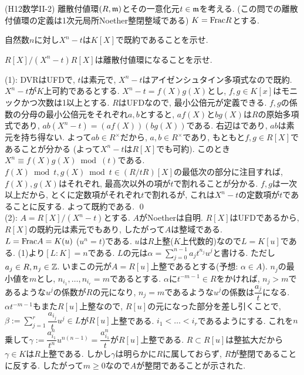 \begin{egprob} (H12数学II-2) \label{prob:H12-II-2}
離散付値環$(R,\mathfrak{m})$とその一意化元$t\in \mathfrak{m}$を考える. (この問での離散付値環の定義は1次元局所Noether整閉整域である) $K=\mathrm{Frac}R$とする.
\ben
\item 自然数$n$に対し$X^n-t$は$K[X]$で既約であることを示せ.
\item $R[X]/(X^n-t)R[X]$は離散付値環になることを示せ.
\een
\end{egprob}
\begin{egans}
(1): DVRはUFDで, $t$は素元で, $X^n - t$はアイゼンシュタイン多項式なので既約. \\
 $X^n - t$が$K$上可約であるとする. $X^n - t = f(X)g(X)$とし, $f,g\in K[x]$はモニックかつ次数は1以上とする. $R$はUFDなので, 最小公倍元が定義できる. $f,g$の係数の分母の最小公倍元をそれぞれ$a,b$とすると, $af(X)$と$bg(X)
$は$R$の原始多項式であり, $ab(X^n - t) = (af(X))(bg(X))$である. 右辺はであり, $ab$は素元を持ち得ない. よって$ab\in R^{\times}$だから, $a,b\in R^{\times}$であり, もともと$f,g\in R[X]$であることが分かる (よって$X^n-t$は$R[X]$でも可約). このとき$X^n \equiv f(X)g(X) \bmod{(t)}$である. $f(X) \bmod{t},g(X)\bmod{t} \in (R/tR)[X]$の最低次の部分に注目すれば, $f(X),g(X)$はそれぞれ, 最高次以外の項が$t$で割れることが分かる. $f,g$は一次以上だから, とくに定数項がそれぞれ$t$で割れるが, これは$X^n-t$の定数項が$t$であることに反する. よって既約である. \qed \\
(2): $A=R[X]/(X^n-t)$とする. $A$がNoetherは自明. $R[X]$はUFDであるから, $R[X]$の既約元は素元でもあり, したがって$A$は整域である. \\
 $L=\mathrm{Frac}A = K(u)$ ($u^n = t$)である. $u$は$R$上整($K$上代数的)なので$L=K[u]$である. (1)より$[L:K] = n$である. $L$の元は$\alpha = \sum_{j=0}^{n-1} a_jt^{n_j} u^j$と書ける. ただし$a_j\in R, n_j\in \mathbb{Z}$.  いまこの元が$A=R[u]$上整であるとする(予想: $\alpha \in A$). $n_j$の最小値を$m$とし, $n_{i_1},\dots, n_{i_r} = m$であるとする. 
$\alpha$に$t^{-m-1}\in R$をかければ, $n_j > m$であるような$u^j$の係数が$R$の元になり, $n_j = m$であるような$u^j$の係数は$\dfrac{a_j}{t}$になる. $\alpha t^{-m-1}$もまた$R[u]$上整なので, $R[u]$の元になった部分を差し引くことで, $\beta:=\sum_{j=1}^{r} \dfrac{a_{i_j}}{t}u^j\in L$が$R[u]$上整である. $i_1<\dots < i_r$であるようにする. これを$n$乗して$\gamma:=\dfrac{a_{i_1}^n}{t^n}u^{n(n-1)} = \dfrac{a_{i_1}^n}{t}$が$R[u]$上整である. $R\subset R[u]$は整拡大だから$\gamma\in K$は$R$上整である. しかし$\gamma$は明らかに$R$に属しておらず, $R$が整閉であることに反する. したがって$m\geq 0$なので$A$が整閉であることが示された. \\

\end{egans}
